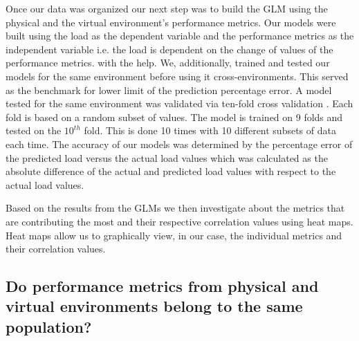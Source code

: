 Once our data was organized our next step was to build the GLM using the physical and the virtual environment's performance metrics. Our models were built using the load as the dependent variable and the performance metrics as the independent variable i.e. the load is dependent on the change of values of the performance metrics. with the help. We, additionally, trained and tested our models for the same environment before using it cross-environments. This served as the benchmark for lower limit of the prediction percentage error. A model tested for the same environment was validated via ten-fold cross validation \cite{Cross_Validation} \cite{kohavi1995study}. Each fold is based on a random subset of values. The model is trained on 9 folds and tested on the $10^{th}$ fold. This is done 10 times with 10 different subsets of data each time. The accuracy of our models was determined by the percentage error of the predicted load versus the actual load values which was calculated as the absolute difference of the actual and predicted load values with respect to the actual load values.

Based on the results from the GLMs we then investigate about the metrics that are contributing the most and their respective correlation values using heat maps. Heat maps allow us to graphically view, in our case, the individual metrics and their correlation values. 

\subsection{\textbf{Do performance metrics from physical and virtual environments belong to the same population?}}



